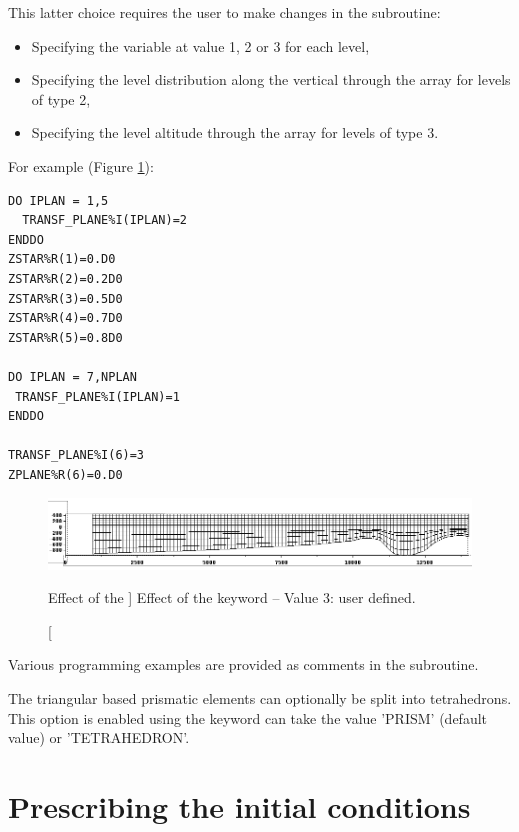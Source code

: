 This latter choice requires the user to make changes in the 
subroutine:

\begin{itemize}
\item Specifying the variable  at value 1, 2 or 3
for each level,

\item Specifying the level distribution along the vertical through the array
 for levels of type 2,

\item Specifying the level altitude through the array  
for levels of type 3.
\end{itemize}

For example (Figure \ref{fig:mesh_transf3}):
\begin{lstlisting}[language=TelFortran]
DO IPLAN = 1,5
  TRANSF_PLANE%I(IPLAN)=2
ENDDO
ZSTAR%R(1)=0.D0
ZSTAR%R(2)=0.2D0
ZSTAR%R(3)=0.5D0
ZSTAR%R(4)=0.7D0
ZSTAR%R(5)=0.8D0

DO IPLAN = 7,NPLAN
 TRANSF_PLANE%I(IPLAN)=1
ENDDO

TRANSF_PLANE%I(6)=3
ZPLANE%R(6)=0.D0
\end{lstlisting}

\begin{figure}[H]%
\begin{center}
%
  \includegraphics[width=\textwidth]{./graphics/mesh_transformation3}
%
\end{center}
\caption
[Effect of the ]
{Effect of the  keyword -- Value 3: user defined.}
\label{fig:mesh_transf3}
\end{figure}

Various programming examples are provided as comments in the 
subroutine.

The triangular based prismatic elements can optionally be split into
tetrahedrons. This option is enabled using the  keyword can
take the value 'PRISM' (default value) or 'TETRAHEDRON'.


\section{Prescribing the initial conditions}

